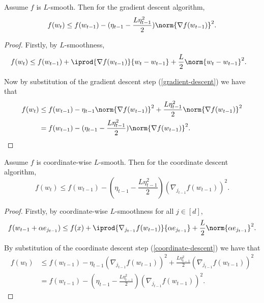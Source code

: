 \documentclass[10pt]{article} %
\begin{document}
\iffalse
\begin{lemma}
\label{lem:descent-gradient}
    Assume $f$ is $L$-smooth. Then for the gradient descent algorithm,
    $$f(w_{t}) \leq f(w_{t-1}) - (\eta_{t-1} - \frac{L\eta_{t-1}^2}{2})\norm{\nabla f(w_{t-1})}^2.$$
\end{lemma}
\begin{proof}
    Firstly, by $L$-smoothness,
    \begin{align*}
        f(w_{t}) 
        &\leq f(w_{t-1}) + \iprod{\nabla f(w_{t-1})}{w_{t} - w_{t-1}} + \frac{L}{2}\norm{w_{t} - w_{t-1}}^2.
    \end{align*}
    
    Now by substitution of the gradient descent step (\ref{gradient-descent}) we have that
    \begin{align*}
        f(w_{t}) 
        &\leq f(w_{t-1}) - \eta_{t-1}\norm{\nabla f(w_{t-1})}^2 + \frac{L\eta_{t-1}^2}{2}\norm{\nabla f(w_{t-1})}^2 \\
        &= f(w_{t-1}) - (\eta_{t-1} - \frac{L\eta_{t-1}^2}{2})\norm{\nabla f(w_{t-1})}^2.
    \end{align*}
\end{proof}

\begin{lemma}
\label{lem:descent-coordinate}
    Assume $f$ is coordinate-wise $L$-smooth. Then for the coordinate descent algorithm,
    $$f(w_{t}) \leq f(w_{t-1}) - (\eta_{t-1} - \frac{L\eta_{t-1}^2}{2})(\nabla_{j_{t-1}} f(w_{t-1}))^2.$$
\end{lemma}
\begin{proof}
    Firstly, by coordinate-wise $L$-smoothness for all $j \in [d]$,
    \begin{align*}
        f(w_{t-1} + \alpha e_{j_{t-1}}) \leq f(x) + \iprod{\nabla_{j_{t-1}} f(w_{t-1})}{\alpha e_{j_{t-1}}} + \frac{L}{2}\norm{\alpha e_{j_{t-1}}}^2.
    \end{align*}
    
    By substitution of the coordinate descent step (\ref{coordinate-descent}) we have that
    \begin{align*}
        f(w_{t}) 
        &\leq f(w_{t-1}) - \eta_{t-1}(\nabla_{j_{t-1}} f(w_{t-1}))^2 + \frac{L\eta_{t-1}^2}{2}(\nabla_{j_{t-1}} f(w_{t-1}))^2 \\
        &= f(w_{t-1}) - (\eta_{t-1} - \frac{L\eta_{t-1}^2}{2})(\nabla_{j_{t-1}} f(w_{t-1}))^2.
    \end{align*}
\end{proof}
\end{document}
